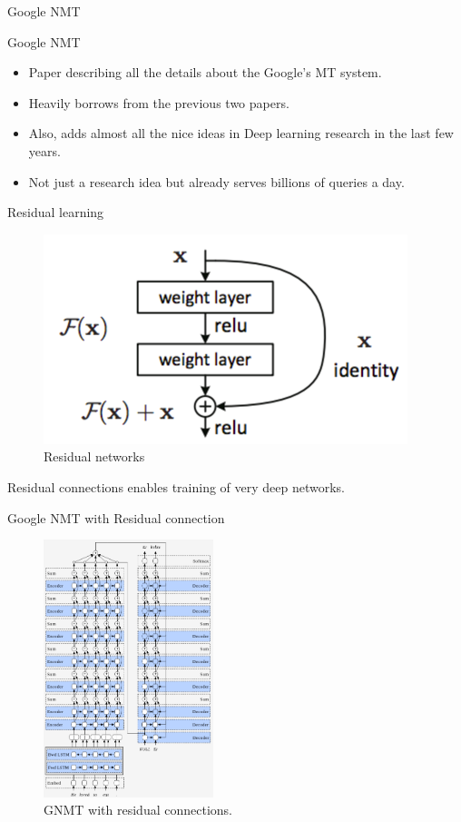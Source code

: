 ﻿\documentclass[table,aspectratio=43,mathserif,xcolor={usenames,dvipsnames,svgnames,table},10pt]{beamer}
\begin{document}
\begin{section}{Google NMT}
\end{section}

\begin{frame}{Google NMT}
\begin{itemize}
 \item<+-> Paper describing all the details about the Google's MT system.
 \item<+-> Heavily borrows from the previous two papers.
 \item<+-> Also, adds almost all the nice ideas in Deep learning research in the last few years.
 \item<+-> Not just a research idea but already serves billions of queries a day.
\end{itemize}
\end{frame}



\begin{frame}{Residual learning}
  \begin{figure}[h]
    \includegraphics[width=.9\linewidth]{images/residual.png}  
    \caption{ Residual networks}
  \end{figure}
  \vspace{-1cm}
  Residual connections enables training of very deep networks. 
\end{frame}

\begin{frame}{Google NMT with Residual connection}
 \begin{figure}[h]
    \includegraphics[height=7.5cm]{images/residual_gnmt.png}  
    \caption{ GNMT with residual connections.}
  \end{figure}
\end{frame}
\end{document}
